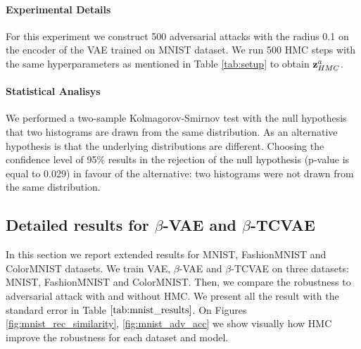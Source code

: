 \paragraph{Experimental Details}
For this experiment we construct 500 adversarial attacks with the radius 0.1 on the encoder of the VAE trained on MNIST dataset. We run 500 HMC steps with the same hyperparameters as mentioned in Table \ref{tab:setup} to obtain ${\mathbf{z}}^a_{HMC}$.

\paragraph{Statistical Analisys}
We performed a two-sample Kolmagorov-Smirnov test with the null hypothesis that two histograms are drawn from the same distribution. As an alternative hypothesis is that the underlying distributions are different. Choosing the confidence level of 95\% results in the rejection of the null hypothesis (p-value is equal to 0.029) in favour of the alternative: two histograms were not drawn from the same distribution.




\newpage
\subsection{Detailed results for $\beta$-VAE and $\beta$-TCVAE} \label{appendix:beta_vae}
In this section we report extended results for MNIST, FashionMNIST and ColorMNIST datasets. We train VAE,  $\beta$-VAE and $\beta$-TCVAE on three datasets: MNIST, FashionMNIST and ColorMNIST. Then, we compare the robustness to adversarial attack with and without HMC. We present all the result with the standard error in Table $\ref{tab:mnist_results}$. On Figures \ref{fig:mnist_rec_similarity}, \ref{fig:mnist_adv_acc} we show visually how HMC improve the robustness for each dataset and model. 

